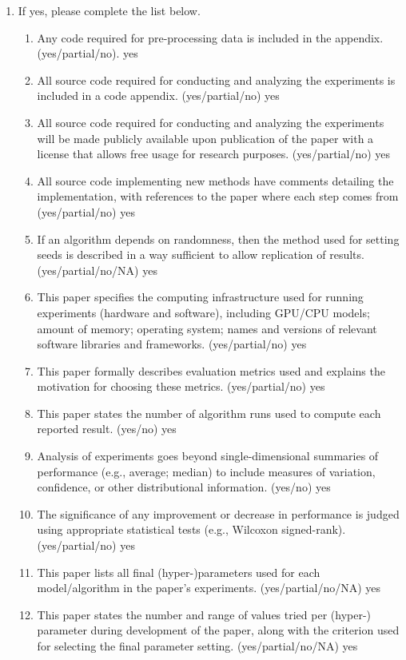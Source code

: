 \begin{enumerate}
\begin{enumerate}
        \item If yes, please complete the list below.
        \begin{enumerate}
            \item Any code required for pre-processing data is included in the appendix. (yes/partial/no). {\color{red} yes}
            \item All source code required for conducting and analyzing the experiments is included in a code appendix. (yes/partial/no) {\color{red} yes}
            \item All source code required for conducting and analyzing the experiments will be made publicly available upon publication of the paper with a license that allows free usage for research purposes. (yes/partial/no) {\color{red} yes}
            \item All source code implementing new methods have comments detailing the implementation, with references to the paper where each step comes from (yes/partial/no) {\color{red} yes}
            \item If an algorithm depends on randomness, then the method used for setting seeds is described in a way sufficient to allow replication of results. (yes/partial/no/NA) {\color{red} yes}
            \item This paper specifies the computing infrastructure used for running experiments (hardware and software), including GPU/CPU models; amount of memory; operating system; names and versions of relevant software libraries and frameworks. (yes/partial/no) {\color{red} yes}
            \item This paper formally describes evaluation metrics used and explains the motivation for choosing these metrics. (yes/partial/no) {\color{red} yes}
            \item This paper states the number of algorithm runs used to compute each reported result. (yes/no) {\color{red} yes}
            \item Analysis of experiments goes beyond single-dimensional summaries of performance (e.g., average; median) to include measures of variation, confidence, or other distributional information. (yes/no) {\color{red} yes}
            \item The significance of any improvement or decrease in performance is judged using appropriate statistical tests (e.g., Wilcoxon signed-rank). (yes/partial/no) {\color{red} yes}
            \item This paper lists all final (hyper-)parameters used for each model/algorithm in the paper’s experiments. (yes/partial/no/NA) {\color{red} yes}
            \item This paper states the number and range of values tried per (hyper-) parameter during development of the paper, along with the criterion used for selecting the final parameter setting. (yes/partial/no/NA) {\color{red} yes}
        \end{enumerate}
        
    \end{enumerate}
\end{enumerate}

